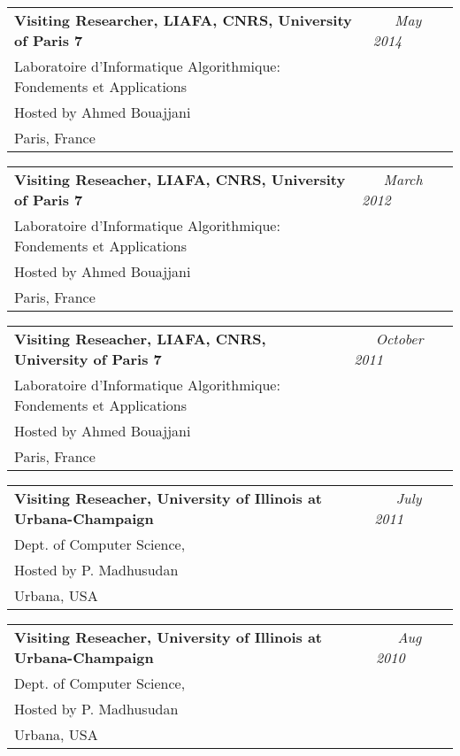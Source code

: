 \begin{resume}
\begin{tabular}{@{}p{4.6in}p{1.8in}}
{\bf Visiting Researcher, LIAFA, CNRS, University of Paris 7}&
 \emph{~~~May 2014}\\
Laboratoire d'Informatique Algorithmique: Fondements et Applications &~\\
Hosted by Ahmed Bouajjani ~\\
Paris, France~\\
\end{tabular}


\begin{tabular}{@{}p{4.6in}p{1.8in}}
{\bf Visiting Reseacher, LIAFA, CNRS, University of Paris 7}&
 \emph{~~~March 2012}\\
Laboratoire d'Informatique Algorithmique: Fondements et Applications &~\\
Hosted by Ahmed Bouajjani ~\\
Paris, France~\\
\end{tabular}



\begin{tabular}{@{}p{4.6in}p{1.8in}}
{\bf Visiting Reseacher, LIAFA, CNRS, University of Paris 7}&
 \emph{~~~October 2011}\\
Laboratoire d'Informatique Algorithmique: Fondements et Applications &~\\
Hosted by Ahmed Bouajjani ~\\
Paris, France~\\
\end{tabular}


\begin{tabular}{@{}p{4.6in}p{1.8in}}
{\bf Visiting Reseacher, University of
Illinois at Urbana-Champaign}&
 \emph{~~~July 2011}\\
 Dept. of Computer Science, \\
Hosted by P. Madhusudan ~\\
Urbana, USA~\\
\end{tabular}


\begin{tabular}{@{}p{4.6in}p{1.8in}}
{\bf Visiting Reseacher, University of
Illinois at Urbana-Champaign}&
 \emph{~~~Aug 2010}\\
 Dept. of Computer Science, \\
Hosted by P. Madhusudan ~\\
Urbana, USA~\\
\end{tabular}




\end{resume}
